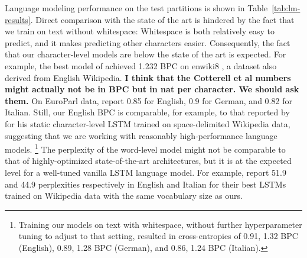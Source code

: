 Language modeling performance on the test partitions is shown in
Table~\ref{tab:lm-results}.  Direct comparison with the state of the art is hindered by
the fact that we train on text without whitespace: Whitespace is both
relatively easy to predict, and it makes predicting other
characters easier. Consequently, the fact that our character-level models are
below the state of the art is expected. For example, the best model of
 achieved 1.232 BPC on enwiki8
\cite{hutter2018}, a dataset also derived from English
Wikipedia. %
\textbf{I think that the Cotterell et al numbers might actually not be in BPC but in nat per character. We should ask them.}
On EuroParl data,  report 0.85 for English,
0.9 for German, and 0.82 for Italian. Still, our English BPC is
comparable, for example, to that reported by  for
his static character-level LSTM trained on space-delimited Wikipedia data,
suggesting that we are working with reasonably high-performance language
models.
\footnote{Training our models on text with whitespace, without further hyperparameter tuning to adjust to that setting, resulted in cross-entropies of 0.91, 1.32 BPC (English), 0.89, 1.28 BPC (German), and 0.86, 1.24 BPC (Italian).}
The perplexity of the word-level model might not be comparable to
that of highly-optimized state-of-the-art architectures, but it is at the
expected level for a well-tuned vanilla LSTM language model. For
example,  report 51.9 and 44.9 perplexities respectively in English and Italian for
their best LSTMs trained on Wikipedia data with the same vocabulary
size as ours.

